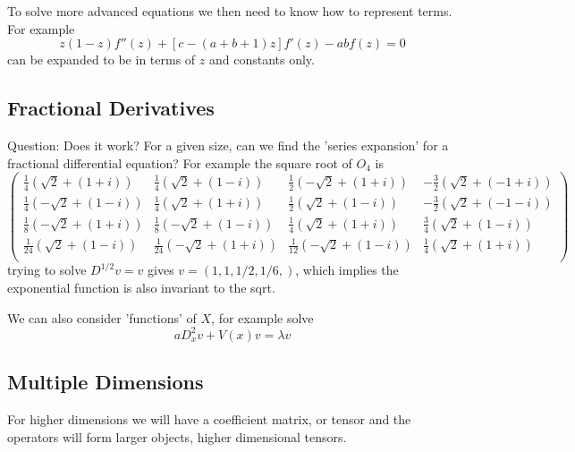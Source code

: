 \documentclass{article}
\begin{document}
To solve more advanced equations we then need to know how to represent terms. For example
$$
z(1-z)f''(z)+[c-(a+b+1)z]f'(z)-abf(z) = 0
$$
can be expanded to be in terms of $z$ and constants only.

\subsection{Fractional Derivatives}
Question: Does it work? For a given size, can we find the 'series expansion' for a fractional differential equation? 
For example the square root of $O_4$ is 
$$
   \left(
   \begin{array}{cccc}
    \frac{1}{4} \left(\sqrt{2}+(1+i)\right) & \frac{1}{4}
      \left(\sqrt{2}+(1-i)\right) & \frac{1}{2} \left(-\sqrt{2}+(1+i)\right) &
      -\frac{3}{2} \left(\sqrt{2}+(-1+i)\right) \\
    \frac{1}{4} \left(-\sqrt{2}+(1-i)\right) & \frac{1}{4}
      \left(\sqrt{2}+(1+i)\right) & \frac{1}{2} \left(\sqrt{2}+(1-i)\right) &
      -\frac{3}{2} \left(\sqrt{2}+(-1-i)\right) \\
    \frac{1}{8} \left(-\sqrt{2}+(1+i)\right) & \frac{1}{8}
      \left(-\sqrt{2}+(1-i)\right) & \frac{1}{4} \left(\sqrt{2}+(1+i)\right) &
      \frac{3}{4} \left(\sqrt{2}+(1-i)\right) \\
    \frac{1}{24} \left(\sqrt{2}+(1-i)\right) & \frac{1}{24}
      \left(-\sqrt{2}+(1+i)\right) & \frac{1}{12} \left(-\sqrt{2}+(1-i)\right) &
      \frac{1}{4} \left(\sqrt{2}+(1+i)\right) \\
   \end{array}
   \right)
$$
trying to solve $D^{1/2} v = v$ gives $v=(1,1,1/2,1/6,)$, which implies the exponential function is also invariant to the sqrt.

We can also consider 'functions' of $X$, for example solve 
$$
a D_x^2 v + V(x)v = \lambda v 
$$


\subsection{Multiple Dimensions}
For higher dimensions we will have a coefficient matrix, or tensor and the operators will form larger objects, higher dimensional tensors. 
\end{document}
